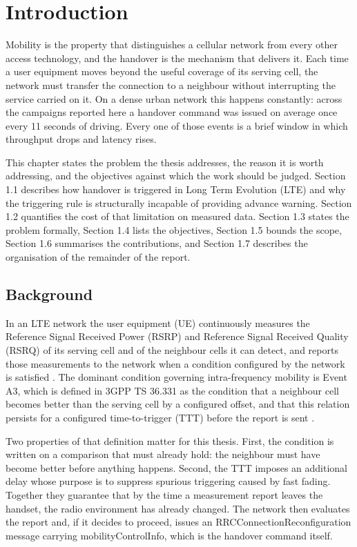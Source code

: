 \chapter{Introduction}\label{ch:1}

Mobility is the property that distinguishes a cellular network from every other access technology, and the handover is the mechanism that delivers it. Each time a user equipment moves beyond the useful coverage of its serving cell, the network must transfer the connection to a neighbour without interrupting the service carried on it. On a dense urban network this happens constantly: across the campaigns reported here a handover command was issued on average once every 11 seconds of driving. Every one of those events is a brief window in which throughput drops and latency rises.

This chapter states the problem the thesis addresses, the reason it is worth addressing, and the objectives against which the work should be judged. Section 1.1 describes how handover is triggered in Long Term Evolution (LTE) and why the triggering rule is structurally incapable of providing advance warning. Section 1.2 quantifies the cost of that limitation on measured data. Section 1.3 states the problem formally, Section 1.4 lists the objectives, Section 1.5 bounds the scope, Section 1.6 summarises the contributions, and Section 1.7 describes the organisation of the remainder of the report.


\section{Background}
\label{sec:1_1}

In an LTE network the user equipment (UE) continuously measures the Reference Signal Received Power (RSRP) and Reference Signal Received Quality (RSRQ) of its serving cell and of the neighbour cells it can detect, and reports those measurements to the network when a condition configured by the network is satisfied \cite{ref1}. The dominant condition governing intra-frequency mobility is Event A3, which is defined in 3GPP TS 36.331 as the condition that a neighbour cell becomes better than the serving cell by a configured offset, and that this relation persists for a configured time-to-trigger (TTT) before the report is sent \cite{ref1}.

Two properties of that definition matter for this thesis. First, the condition is written on a comparison that must already hold: the neighbour must have become better before anything happens. Second, the TTT imposes an additional delay whose purpose is to suppress spurious triggering caused by fast fading. Together they guarantee that by the time a measurement report leaves the handset, the radio environment has already changed. The network then evaluates the report and, if it decides to proceed, issues an RRCConnectionReconfiguration message carrying mobilityControlInfo, which is the handover command itself.


